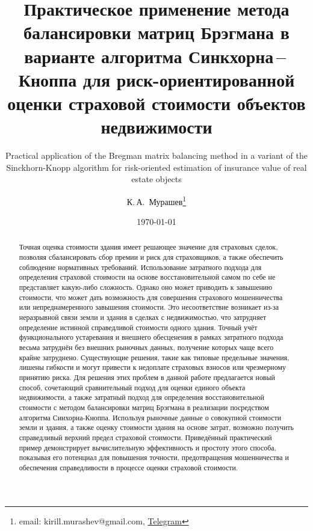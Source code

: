 \documentclass[12pt]{scrartcl}
\title{Практическое применение метода балансировки матриц Брэгмана в варианте алгоритма Синкхорна\,--\,Кноппа для риск-ориентированной оценки страховой стоимости объектов недвижимости}
\subtitle{\foreignlanguage{english}{Practical application of the Bregman matrix balancing method in a variant of the Sinckhorn-Knopp algorithm for risk-oriented estimation of insurance value of real estate objects}}
\author{К.\,А.~Мурашев\thanks{email: kirill.murashev@gmail.com, \href{https://t.me/AIinValuation}{Telegram}}}
\date{\today}
\begin{document}
\maketitle

\begin{abstract}
Точная оценка стоимости здания имеет решающее значение для страховых сделок, позволяя сбалансировать сбор премии и риск для страховщиков, а также обеспечить соблюдение нормативных требований. Использование затратного подхода для определения страховой стоимости на основе восстановительной самом по себе не представляет какую-либо сложность. Однако оно может приводить к завышению стоимости, что может дать возможность для совершения страхового мошенничества или непреднамеренного завышения стоимости. Это несоответствие возникает из-за неразрывной связи земли и здания в сделках с недвижимостью, что затрудняет определение истинной справедливой стоимости одного здания. Точный учёт функционального устаревания и внешнего обесценения в рамках затратного подхода весьма затруднён без внешних рыночных данных, получение которых чаще всего крайне затруднено. Существующие решения, такие как типовые предельные значения, лишены гибкости и могут привести к недоплате страховых взносов или чрезмерному принятию риска. Для решения этих проблем в данной работе предлагается новый способ, сочетающий сравнительный подход для оценки единого объекта недвижимости, а также затратный подход для определения восстановительной стоимости с методом балансировки матриц Брэгмана в реализации посредством алгоритма Синхорна-Кноппа. Используя рыночные данные о совокупной стоимости земли и здания, а также оценку стоимости здания на основе затрат, возможно получить справедливый верхний предел страховой стоимости. Приведённый практический пример демонстрирует вычислительную эффективность и простоту этого способа, показывая его потенциал для повышения точности, предотвращения мошенничества и обеспечения справедливости в процессе оценки страховой стоимости.



\end{abstract}
\end{document}
